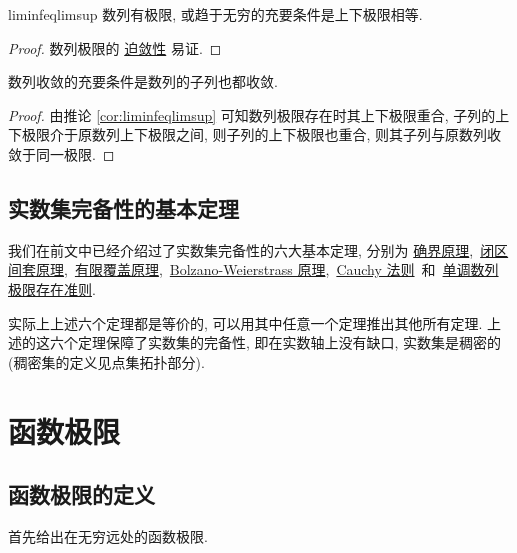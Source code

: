 \documentclass[cn,toc=twocol]{elegantbook}
\begin{document}
\begin{corollary}{}{liminfeqlimsup}
	数列有极限, 或趋于无穷的充要条件是上下极限相等.
\end{corollary}

\begin{proof}
	数列极限的 \hyperref[thm:Ssandwich]{迫敛性} 易证.
\end{proof}

\begin{corollary}
	数列收敛的充要条件是数列的子列也都收敛.
\end{corollary}

\begin{proof}
	由推论 \ref{cor:liminfeqlimsup} 可知数列极限存在时其上下极限重合, 子列的上下极限介于原数列上下极限之间, 则子列的上下极限也重合, 则其子列与原数列收敛于同一极限.
\end{proof}

\subsection{实数集完备性的基本定理}

我们在前文中已经介绍过了实数集完备性的六大基本定理, 分别为 \hyperref[thm:R1]{确界原理},\ \hyperref[thm:R2]{闭区间套原理},\ \hyperref[thm:R3]{有限覆盖原理},\ \hyperref[thm:R4]{Bolzano-Weierstrass 原理},\ \hyperref[thm:R5]{Cauchy 法则}\ 和\ \hyperref[thm:R6]{单调数列极限存在准则}.

实际上上述六个定理都是等价的, 可以用其中任意一个定理推出其他所有定理. 上述的这六个定理保障了实数集的完备性, 即在实数轴上没有缺口, 实数集是稠密的 (稠密集的定义见点集拓扑部分).


\section{函数极限}

\subsection{函数极限的定义}

首先给出在无穷远处的函数极限.
\end{document}
